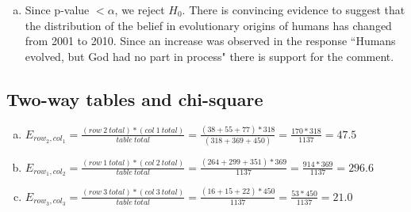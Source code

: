 {{\begin{enumerate}[(a)]
\begin{align*}
\chi^2 &= \sum \frac{(O - E)^2}{E} =  \frac{(387 - 377)^2} {377} + \frac{(163 - 122)^2} {122} + \frac{(408 - 459)^2} {459} + \frac{(61 - 61)^2}{61} = 19.71 \\
df &= k - 1 = 4 - 1 = 3 \\
p-value &< 0.001
\end{align*}
\item Since p-value $< \alpha$, we reject $H_0$. There is convincing evidence to suggest that the distribution of the belief in evolutionary origins of humans has changed from 2001 to 2010. Since an increase was observed in the response ``Humans evolved, but God had no part in process" there is support for the comment.
\end{enumerate}
}
}


%

\subsection{Two-way tables and chi-square}

{
{
\begin{enumerate}[(a)]
\item $E_{row_2, col_1} = \frac{(row~2~total)*(col~1~total)}{table~total} = \frac{(38+55+77) * 318}{(318+369+450)} = \frac{170 * 318}{1137} = 47.5$
\item $E_{row_1, col_2} = \frac{(row~1~total)*(col~2~total)}{table~total} = \frac{(264+299+351) * 369}{1137} = \frac{914 * 369}{1137} = 296.6$
\item $E_{row_3, col_3} = \frac{(row~3~total)*(col~3~total)}{table~total} = \frac{(16+15+22) * 450}{1137} = \frac{53 * 450}{1137} = 21.0$
\end{enumerate}
}
}

